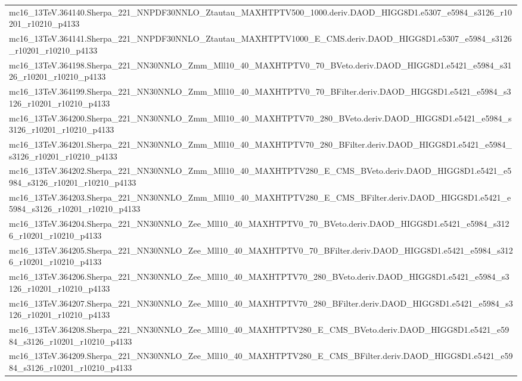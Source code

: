 \begin{adjustwidth}{-3em}{-3em}
\begin{longtable}{l}
mc16\_13TeV.364140.Sherpa\_221\_NNPDF30NNLO\_Ztautau\_MAXHTPTV500\_1000.deriv.DAOD\_HIGG8D1.e5307\_e5984\_s3126\_r10201\_r10210\_p4133 \\
mc16\_13TeV.364141.Sherpa\_221\_NNPDF30NNLO\_Ztautau\_MAXHTPTV1000\_E\_CMS.deriv.DAOD\_HIGG8D1.e5307\_e5984\_s3126\_r10201\_r10210\_p4133 \\
mc16\_13TeV.364198.Sherpa\_221\_NN30NNLO\_Zmm\_Mll10\_40\_MAXHTPTV0\_70\_BVeto.deriv.DAOD\_HIGG8D1.e5421\_e5984\_s3126\_r10201\_r10210\_p4133 \\
mc16\_13TeV.364199.Sherpa\_221\_NN30NNLO\_Zmm\_Mll10\_40\_MAXHTPTV0\_70\_BFilter.deriv.DAOD\_HIGG8D1.e5421\_e5984\_s3126\_r10201\_r10210\_p4133 \\
mc16\_13TeV.364200.Sherpa\_221\_NN30NNLO\_Zmm\_Mll10\_40\_MAXHTPTV70\_280\_BVeto.deriv.DAOD\_HIGG8D1.e5421\_e5984\_s3126\_r10201\_r10210\_p4133 \\
mc16\_13TeV.364201.Sherpa\_221\_NN30NNLO\_Zmm\_Mll10\_40\_MAXHTPTV70\_280\_BFilter.deriv.DAOD\_HIGG8D1.e5421\_e5984\_s3126\_r10201\_r10210\_p4133 \\
mc16\_13TeV.364202.Sherpa\_221\_NN30NNLO\_Zmm\_Mll10\_40\_MAXHTPTV280\_E\_CMS\_BVeto.deriv.DAOD\_HIGG8D1.e5421\_e5984\_s3126\_r10201\_r10210\_p4133 \\
mc16\_13TeV.364203.Sherpa\_221\_NN30NNLO\_Zmm\_Mll10\_40\_MAXHTPTV280\_E\_CMS\_BFilter.deriv.DAOD\_HIGG8D1.e5421\_e5984\_s3126\_r10201\_r10210\_p4133 \\
mc16\_13TeV.364204.Sherpa\_221\_NN30NNLO\_Zee\_Mll10\_40\_MAXHTPTV0\_70\_BVeto.deriv.DAOD\_HIGG8D1.e5421\_e5984\_s3126\_r10201\_r10210\_p4133 \\
mc16\_13TeV.364205.Sherpa\_221\_NN30NNLO\_Zee\_Mll10\_40\_MAXHTPTV0\_70\_BFilter.deriv.DAOD\_HIGG8D1.e5421\_e5984\_s3126\_r10201\_r10210\_p4133 \\
mc16\_13TeV.364206.Sherpa\_221\_NN30NNLO\_Zee\_Mll10\_40\_MAXHTPTV70\_280\_BVeto.deriv.DAOD\_HIGG8D1.e5421\_e5984\_s3126\_r10201\_r10210\_p4133 \\
mc16\_13TeV.364207.Sherpa\_221\_NN30NNLO\_Zee\_Mll10\_40\_MAXHTPTV70\_280\_BFilter.deriv.DAOD\_HIGG8D1.e5421\_e5984\_s3126\_r10201\_r10210\_p4133 \\
mc16\_13TeV.364208.Sherpa\_221\_NN30NNLO\_Zee\_Mll10\_40\_MAXHTPTV280\_E\_CMS\_BVeto.deriv.DAOD\_HIGG8D1.e5421\_e5984\_s3126\_r10201\_r10210\_p4133 \\
mc16\_13TeV.364209.Sherpa\_221\_NN30NNLO\_Zee\_Mll10\_40\_MAXHTPTV280\_E\_CMS\_BFilter.deriv.DAOD\_HIGG8D1.e5421\_e5984\_s3126\_r10201\_r10210\_p4133 \\

\end{longtable}
\end{adjustwidth}
